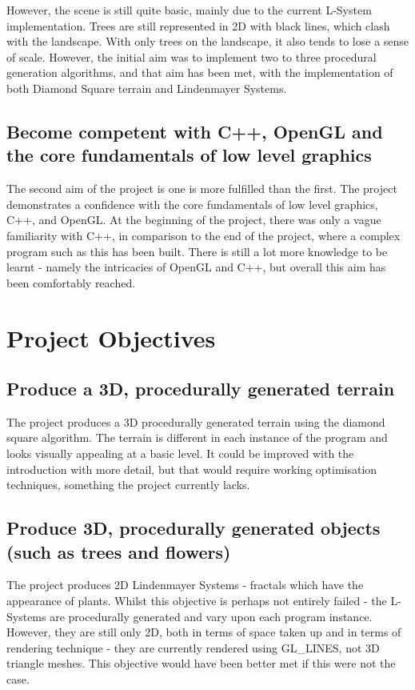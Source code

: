 \documentclass[a4paper,10pt]{report}
\begin{document}
However, the scene is still quite basic, mainly due to the current L-System implementation. Trees are still represented in 2D with black lines, which clash with the landscape. With only trees on the landscape, it also tends to lose a sense of scale. However, the initial aim was to implement two to three procedural generation algorithms, and that aim has been met, with the implementation of both Diamond Square terrain and Lindenmayer Systems. 

\subsection{Become competent with C++, OpenGL and the core fundamentals of low level graphics}

The second aim of the project is one is more fulfilled than the first. The project demonstrates a confidence with the core fundamentals of low level graphics, C++, and OpenGL. At the beginning of the project, there was only a vague familiarity with C++, in comparison to the end of the project, where a complex program such as this has been built.  There is still a lot more knowledge to be learnt - namely the intricacies of OpenGL and C++, but overall this aim has been comfortably reached.

\section{Project Objectives}

\subsection{ Produce a 3D, procedurally generated terrain}
The project produces a 3D procedurally generated terrain using the diamond square algorithm. The terrain is different in each instance of the program and looks visually appealing at a basic level. It could be improved with the introduction with more detail, but that would require working optimisation techniques, something the project currently lacks.

\subsection{Produce 3D, procedurally generated objects (such as trees and flowers)}

The project produces 2D Lindenmayer Systems - fractals which have the appearance of plants. Whilst this objective is perhaps not entirely failed - the L-Systems are procedurally generated and vary upon each program instance. However, they are still only 2D, both in terms of space taken up and in terms of rendering technique - they are currently rendered using GL\_LINES, not 3D triangle meshes. This objective would have been better met if this were not the case.
\end{document}
